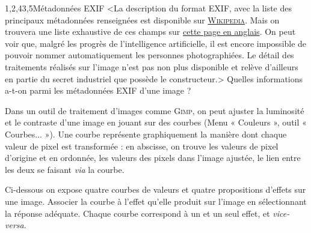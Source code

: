 \begin{quiz}[title={Photographie numérique}]
\begin{quizquestion}[b]{1,2,4}{3,5}{Métadonnées EXIF}
<La description du format EXIF, avec la liste des principaux métadonnées renseignées est disponible sur \href{https://fr.wikipedia.org/wiki/Exchangeable_image_file_format}{\textsc{Wikipedia}}. Mais on trouvera une liste exhaustive de ces champs sur \href{https://exiftool.org/TagNames/EXIF.html}{cette page en anglais}. On peut voir que, malgré les progrès de l'intelligence artificielle, il est encore impossible de pouvoir nommer automatiquement les personnes photographiées. Le détail des traitements réalisés sur l'image n'est pas non plus disponible et relève d'ailleurs en partie du secret industriel que possède le constructeur.>
Quelles informations a-t-on parmi les métadonnées EXIF d’une image ?
\end{quizquestion}

\begingroup\small
Dans un outil de traitement d'images comme \textsc{Gimp}, on peut ajuster la luminosité et le contraste d’une image en jouant sur des courbes (Menu « Couleurs », outil « Courbes... »). Une courbe représente graphiquement la manière dont chaque valeur de pixel est transformée : en abscisse, on trouve les valeurs de pixel d'origine et en ordonnée, les valeurs des pixels dans l'image ajustée, le lien entre les deux se faisant \textit{via} la courbe.

Ci-dessous on expose quatre courbes de valeurs et quatre propositions d’effets sur une image.
Associer la courbe à l'effet qu'elle produit sur l'image en sélectionnant la réponse adéquate. Chaque courbe correspond à un et un seul effet, et \textit{vice-versa}.
\endgroup


\end{quiz}
